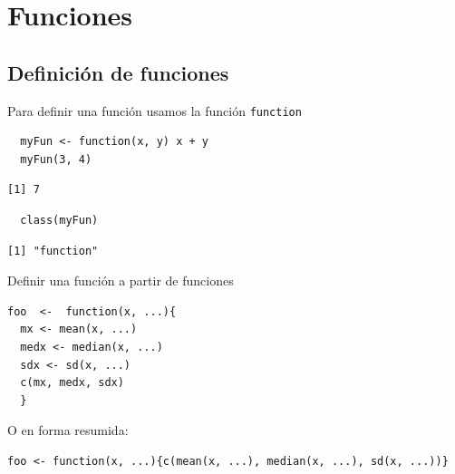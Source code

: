 \documentclass[xcolor={usenames,svgnames,dvipsnames}]{beamer}
\begin{document}
\section{Funciones}
\label{sec-4}

\subsection{Definición de funciones}
\label{sec-4-1}
\begin{frame}[fragile,label=sec-4-1-1]{Para definir una función usamos la función \texttt{function}}
 \lstset{language=R,label= ,caption= ,numbers=none}
\begin{lstlisting}
  myFun <- function(x, y) x + y
  myFun(3, 4)
\end{lstlisting}

\begin{verbatim}
[1] 7
\end{verbatim}

\lstset{language=R,label= ,caption= ,numbers=none}
\begin{lstlisting}
  class(myFun)
\end{lstlisting}

\begin{verbatim}
[1] "function"
\end{verbatim}
\end{frame}

\begin{frame}[fragile,label=sec-4-1-2]{Definir una función a partir de funciones}
 \lstset{language=R,label= ,caption= ,numbers=none}
\begin{lstlisting}
foo  <-  function(x, ...){
  mx <- mean(x, ...)
  medx <- median(x, ...)
  sdx <- sd(x, ...)
  c(mx, medx, sdx)
  }
\end{lstlisting}

O en forma resumida:
\lstset{language=R,label= ,caption= ,numbers=none}
\begin{lstlisting}
foo <- function(x, ...){c(mean(x, ...), median(x, ...), sd(x, ...))}
\end{lstlisting}
\end{frame}
\end{document}
